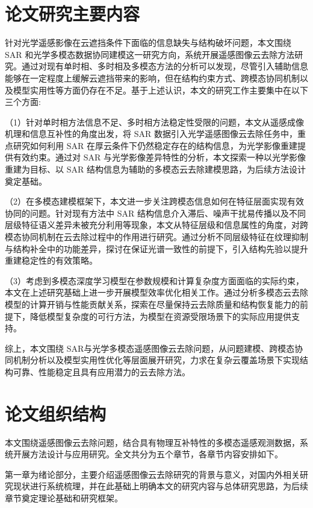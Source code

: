 \section{论文研究主要内容}

针对光学遥感影像在云遮挡条件下面临的信息缺失与结构破坏问题，本文围绕 SAR 和光学多模态数据协同建模这一研究方向，系统开展遥感图像云去除方法研究。通过对现有单时相、多时相及多模态方法的分析可以发现，尽管引入辅助信息能够在一定程度上缓解云遮挡带来的影响，但在结构约束方式、跨模态协同机制以及模型实用性等方面仍存在不足。基于上述认识，本文的研究工作主要集中在以下三个方面:

（1）针对单时相方法信息不足、多时相方法稳定性受限的问题，本文从遥感成像机理和信息互补性的角度出发，将 SAR 数据引入光学遥感图像云去除任务中，重点研究如何利用 SAR 在厚云条件下仍然稳定存在的结构信息，为光学影像重建提供有效约束。通过对 SAR 与光学影像差异特性的分析，本文探索一种以光学影像重建为目标、以 SAR 结构信息为辅助的多模态云去除建模思路，为后续方法设计奠定基础。

（2）在多模态建模框架下，本文进一步关注跨模态信息如何在特征层面实现有效协同的问题。针对现有方法中 SAR 结构信息介入滞后、噪声干扰易传播以及不同层级特征语义差异未被充分利用等现象，本文从特征层级和信息属性的角度，对跨模态协同机制在云去除过程中的作用进行研究。通过分析不同层级特征在纹理抑制与结构补全中的功能差异，探讨在保证光谱一致性的前提下，引入结构先验以提升重建稳定性的有效策略。

（3）考虑到多模态深度学习模型在参数规模和计算复杂度方面面临的实际约束，本文在上述研究基础上进一步开展模型效率优化相关工作。通过分析多模态云去除模型的计算开销与性能贡献关系，探索在尽量保持云去除质量和结构恢复能力的前提下，降低模型复杂度的可行方法，为模型在资源受限场景下的实际应用提供支持。

综上，本文围绕 SAR与光学多模态遥感图像云去除问题，从问题建模、跨模态协同机制分析以及模型实用性优化等层面展开研究，力求在复杂云覆盖场景下实现结构可靠、性能稳定且具有应用潜力的云去除方法。

\section{论文组织结构}

本文围绕遥感图像云去除问题，结合具有物理互补特性的多模态遥感观测数据，系统开展方法设计与应用研究。全文共分为五个章节，各章节内容安排如下。

第一章为绪论部分，主要介绍遥感图像云去除研究的背景与意义，对国内外相关研究现状进行系统梳理，并在此基础上明确本文的研究内容与总体研究思路，为后续章节奠定理论基础和研究框架。

